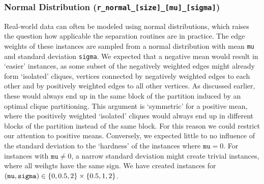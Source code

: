 \subsubsection{Normal Distribution (\texttt{r\_normal\_[size]\_[mu]\_[sigma]})}\label{subsubsec:data_random_normal}
Real-world data can often be modeled using normal distributions, which raises the question how applicable the separation routines are in practice.
The edge weights of these instances are sampled from a normal distribution with mean \texttt{mu} and standard deviation \texttt{sigma}.
We expected that a negative mean would result in ‘easier’ instances, as some subset of the negatively weighted edges might already form ‘isolated’ cliques, \ie vertices connected by negatively weighted edges to each other and by positively weighted edges to all other vertices.
As discussed earlier, these would always end up in the same block of the partition induced by an optimal clique partitioning.
This argument is ‘symmetric’ for a positive mean, where the positively weighted ‘isolated’ cliques would always end up in different blocks of the partition instead of the same block.
For this reason we could restrict our attention to positive means.
Conversely, we expected little to no influence of the standard deviation to the ‘hardness’ of the instances where $\texttt{mu} = 0$.
For instances with $\texttt{mu} \neq 0$, a narrow standard deviation might create trivial instances, where all weihgts have the same sign.
We have created instances for $(\text{\texttt{mu}}, \text{\texttt{sigma}}) \in \left\{ 0, 0.5, 2 \right\} \times \left\{ 0.5, 1, 2 \right\}$.
